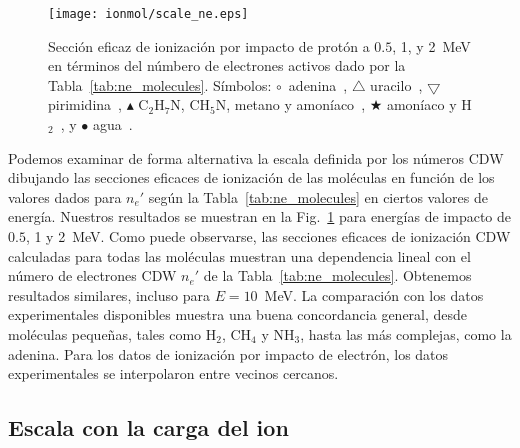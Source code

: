 \begin{figure}[t]
\centering
\texttt{[image: ionmol/scale\_ne.eps]}
\caption[Ionización por impacto de protón en términos de $n_e'$.]
{Sección eficaz de ionización por impacto de protón a $0.5$, 1, y 2~MeV 
en términos del númbero de electrones activos dado por la 
Tabla~\ref{tab:ne_molecules}. Símbolos: 
\mbox{\Large$\circ$}~adenina~\cite{Iriki:11}, 
$\triangle$ uracilo~\cite{itoh2013}, 
$\bigtriangledown$ pirimidina~\cite{wolff2014}, 
$\blacktriangle$ C$_2$H$_7$N, CH$_5$N, metano y amoníaco~\cite{Lynch:76},
\mbox{\scriptsize$\bigstar$} amoníaco y H$_2$~\cite{Rudd:85}, y 
\mbox{\Large$\bullet$} agua~\cite{Luna2007}.}
\label{fig:recta}
\end{figure}

Podemos examinar de forma alternativa la escala definida por los números 
CDW dibujando las secciones eficaces de ionización de las moléculas en 
función de los valores dados para $n_e'$ según la 
Tabla~\ref{tab:ne_molecules} en ciertos valores de energía. Nuestros 
resultados se muestran en la Fig.~\ref{fig:recta} para energías de 
impacto de $0.5$, 1 y 2~MeV. Como puede observarse, las secciones 
eficaces de ionización CDW calculadas para todas las moléculas muestran 
una dependencia lineal con el número de electrones CDW $n_e'$ de la 
Tabla~\ref{tab:ne_molecules}. Obtenemos resultados similares, incluso 
para $E=10$~MeV. La comparación con los datos experimentales disponibles 
muestra una buena concordancia general, desde moléculas pequeñas, tales 
como H$_2$, CH$_4$ y NH$_3$, hasta las más complejas, como la adenina. 
Para los datos de ionización por impacto de electrón, los datos 
experimentales se interpolaron entre vecinos cercanos. 


\subsection{Escala con la carga del ion}
\label{sec:zscaling}

